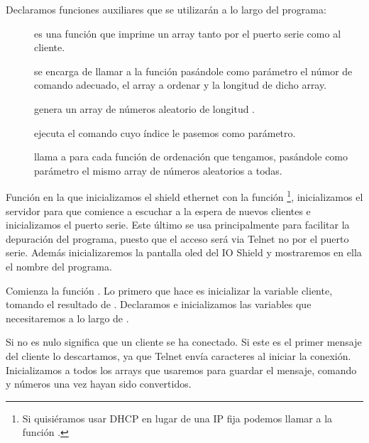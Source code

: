 
Declaramos funciones auxiliares que se utilizarán a lo largo del programa:
\begin{description}
	\item[] es una función que imprime un array tanto por el puerto serie como al cliente.
	\item[] se encarga de llamar a la función  pasándole como parámetro el númor de comando adecuado, el array a ordenar y la longitud de dicho array.
	\item[] genera un array de números aleatorio de longitud .
	\item[] ejecuta el comando cuyo índice le pasemos como parámetro.
	\item[] llama a  para cada función de ordenación que tengamos, pasándole como parámetro el mismo array de números aleatorios a todas.
\end{description}


Función  en la que inicializamos el shield ethernet con la función \protect\footnote{Si quisiéramos usar DHCP en lugar de una IP fija podemos llamar a la función .}, inicializamos el servidor para que comience a escuchar a la espera de nuevos clientes e inicializamos el puerto serie. Este último se usa principalmente para facilitar la depuración del programa, puesto que el acceso será via Telnet no por el puerto serie. Además inicializaremos la pantalla oled del IO Shield y mostraremos en ella el nombre del programa.


Comienza la función . Lo primero que hace es inicializar la variable cliente, tomando el resultado de . Declaramos e inicializamos las variables que necesitaremos a lo largo de .


Si  no es nulo significa que un cliente se ha conectado. Si este es el primer mensaje del cliente lo descartamos, ya que Telnet envía caracteres al iniciar la conexión. Inicializamos a  todos los arrays que usaremos para guardar el mensaje, comando y números una vez hayan sido convertidos.

